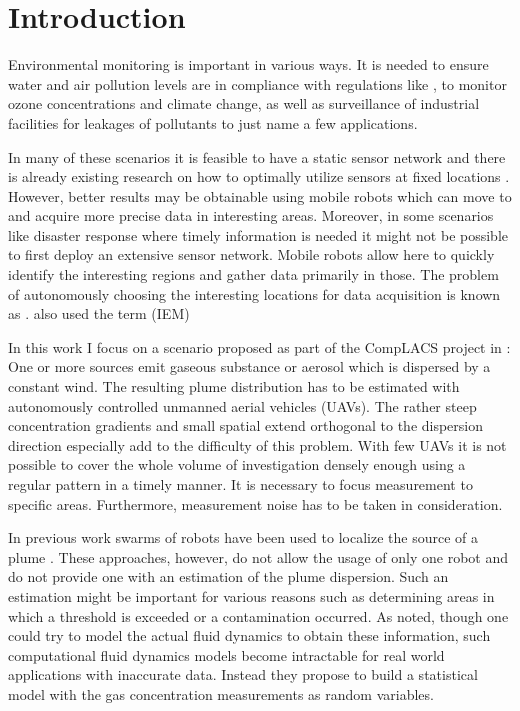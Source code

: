 \chapter{Introduction}
Environmental monitoring is important in various ways. It is needed to ensure 
water and air pollution levels are in compliance with regulations like 
\textcite{Anonymous:1996ui}, to monitor ozone concentrations and climate change,  
as well as surveillance of industrial facilities for leakages of pollutants to 
just name a few applications.

In many of these scenarios it is feasible to have a static sensor network and 
there is already existing research on how to optimally utilize sensors at fixed 
locations \parencite[e.g.][]{Osborne:2008hi, Guestrin:2005cq, Wang:kz}.  
However, better results may be obtainable using mobile robots which can move to 
and acquire more precise data in interesting areas. Moreover, in some scenarios 
like disaster response where timely information is needed it might not be 
possible to first deploy an extensive sensor network. Mobile robots allow here 
to quickly identify the interesting regions and gather data primarily in those.  
The problem of autonomously choosing the interesting locations for data 
acquisition is known as . \textcite{Marchant:2012wb} 
also used the term  (IEM) 

In this work I focus on a scenario proposed as part of the CompLACS project in 
\textcite{denardi2013rn}: One or more sources emit gaseous substance or aerosol 
which is dispersed by a constant wind. The resulting plume distribution has to 
be estimated with autonomously controlled unmanned aerial vehicles (UAVs). The 
rather steep concentration gradients and small spatial extend orthogonal to the 
dispersion direction especially add to the difficulty of this problem.  With few 
UAVs it is not possible to cover the whole volume of investigation densely 
enough using a regular pattern in a timely manner. It is necessary to focus 
measurement to specific areas. Furthermore, measurement noise has to be taken in 
consideration.

In previous work swarms of robots have been used to localize the source of 
a plume \parencite{Jatmiko:2007df, Zarzhitsky:2005tz}. These approaches, 
however, do not allow the usage of only one robot and do not provide one with an 
estimation of the plume dispersion. Such an estimation might be important for 
various reasons such as determining areas in which a threshold is exceeded or 
a contamination occurred. As \textcite{Reggente:2009ti} noted, though one could 
try to model the actual fluid dynamics to obtain these information, such 
computational fluid dynamics models become intractable for real world 
applications with inaccurate data.  Instead they propose to build a statistical 
model with the gas concentration measurements as random variables.

